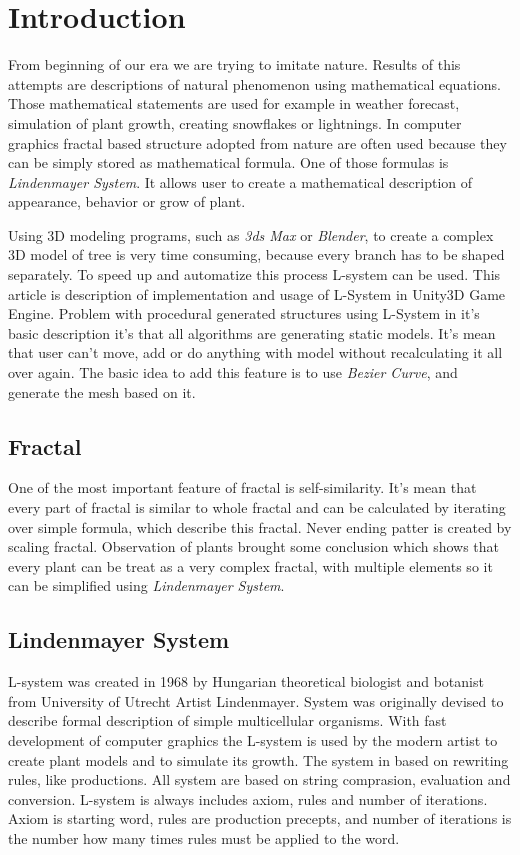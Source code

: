 \documentclass[b5paper,twoside,11pt]{article}
\begin{document}
\section{Introduction}
From beginning of our era we are trying to imitate nature. Results of this attempts are descriptions of natural phenomenon using mathematical equations. Those mathematical statements are used for example in weather forecast, simulation of plant growth, creating snowflakes or lightnings. In computer graphics fractal based structure adopted from nature are often used because they can be simply stored as mathematical formula. One of those formulas is \textit{Lindenmayer System}. It allows user to create a mathematical description of appearance, behavior or grow of plant. 
\par Using 3D modeling programs, such as \textit{3ds Max} or \textit{Blender}, to create a complex 3D model of tree is very time consuming, because every branch has to be shaped separately. To speed up and  automatize this process L-system can be used. This article is description of implementation and usage of L-System in Unity3D Game Engine. Problem with procedural generated structures using L-System in it's basic description it's that all algorithms are generating static models. It's mean that user can't move, add or do anything with model without recalculating it all over again. The basic idea to add this feature is to use \textit{Bezier Curve}, and generate the mesh based on it.
\subsection{Fractal}
One of the most important feature of fractal is self-similarity. It's mean that every part of fractal is similar to whole fractal and can be calculated by iterating over simple formula, which describe this fractal. Never ending patter is created by scaling fractal. Observation of plants brought some conclusion which shows that every plant can be treat as a very complex fractal, with multiple elements so it can be simplified using \textit{Lindenmayer System}.
\subsection{Lindenmayer System}
L-system was created in 1968 by Hungarian theoretical biologist and botanist from University of Utrecht Artist Lindenmayer. System was originally devised to describe formal description of simple multicellular organisms. With fast development of computer graphics the L-system is used by the modern artist to create plant models and to simulate its growth. The system in based on rewriting rules, like productions. All system are based on string comprasion, evaluation and conversion. L-system is always includes axiom, rules and number of iterations. Axiom is starting word, rules are production precepts, and number of iterations   is the number how many times rules must be applied to the word.
\newpage
\end{document}
